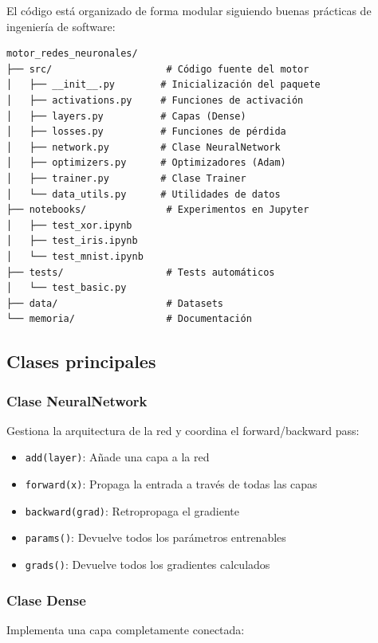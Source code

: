 \documentclass[a4paper,11pt]{article}
\begin{document}
El código está organizado de forma modular siguiendo buenas prácticas de ingeniería de software:

\begin{verbatim}
motor_redes_neuronales/
├── src/                    # Código fuente del motor
│   ├── __init__.py        # Inicialización del paquete
│   ├── activations.py     # Funciones de activación
│   ├── layers.py          # Capas (Dense)
│   ├── losses.py          # Funciones de pérdida
│   ├── network.py         # Clase NeuralNetwork
│   ├── optimizers.py      # Optimizadores (Adam)
│   ├── trainer.py         # Clase Trainer
│   └── data_utils.py      # Utilidades de datos
├── notebooks/              # Experimentos en Jupyter
│   ├── test_xor.ipynb
│   ├── test_iris.ipynb
│   └── test_mnist.ipynb
├── tests/                  # Tests automáticos
│   └── test_basic.py
├── data/                   # Datasets
└── memoria/                # Documentación
\end{verbatim}

\subsection{Clases principales}

\subsubsection{Clase NeuralNetwork}

Gestiona la arquitectura de la red y coordina el forward/backward pass:

\begin{itemize}
    \item \texttt{add(layer)}: Añade una capa a la red
    \item \texttt{forward(x)}: Propaga la entrada a través de todas las capas
    \item \texttt{backward(grad)}: Retropropaga el gradiente
    \item \texttt{params()}: Devuelve todos los parámetros entrenables
    \item \texttt{grads()}: Devuelve todos los gradientes calculados
\end{itemize}

\subsubsection{Clase Dense}

Implementa una capa completamente conectada:
\end{document}
